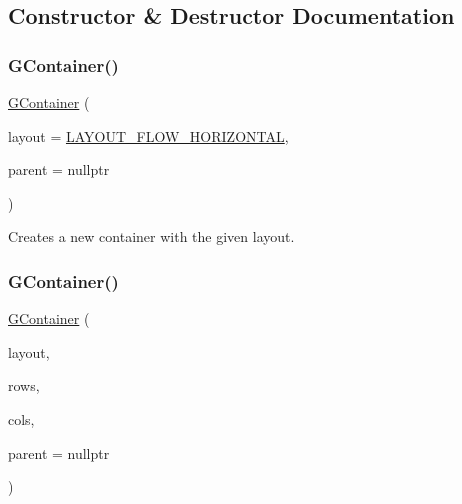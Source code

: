 \subsection{Constructor \& Destructor Documentation}
\mbox{\label{classGContainer_a09fc5a49b2ea0bc895fbf2772c311325}} 
\subsubsection{\texorpdfstring{G\+Container()}{GContainer()}\hspace{0.1cm}{\footnotesize\ttfamily [1/2]}}
{\footnotesize\ttfamily \mbox{\hyperlink{classGContainer}{G\+Container}} (\begin{DoxyParamCaption}\item[{\mbox{\hyperlink{classGContainer_a1b7da28ed84c0763e8f92cde2df4799b}{Layout}}}]{layout = {\ttfamily \mbox{\hyperlink{classGContainer_a1b7da28ed84c0763e8f92cde2df4799bac89a811e02b929a18f7f34e7d3bebd63}{L\+A\+Y\+O\+U\+T\+\_\+\+F\+L\+O\+W\+\_\+\+H\+O\+R\+I\+Z\+O\+N\+T\+AL}}},  }\item[{Q\+Widget $\ast$}]{parent = {\ttfamily nullptr} }\end{DoxyParamCaption})}



Creates a new container with the given layout. 

\mbox{\label{classGContainer_a042cb94e18801664efa748e8a8fa74c1}} 
\subsubsection{\texorpdfstring{G\+Container()}{GContainer()}\hspace{0.1cm}{\footnotesize\ttfamily [2/2]}}
{\footnotesize\ttfamily \mbox{\hyperlink{classGContainer}{G\+Container}} (\begin{DoxyParamCaption}\item[{\mbox{\hyperlink{classGContainer_a1b7da28ed84c0763e8f92cde2df4799b}{Layout}}}]{layout,  }\item[{int}]{rows,  }\item[{int}]{cols,  }\item[{Q\+Widget $\ast$}]{parent = {\ttfamily nullptr} }\end{DoxyParamCaption})}



